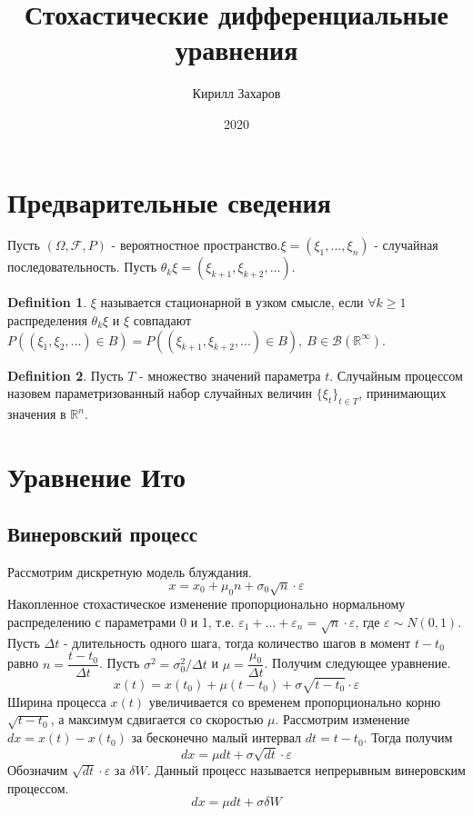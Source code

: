 \documentclass[12pt]{article}
\title{Стохастические дифференциальные уравнения}
\author{Кирилл Захаров}
\date{2020}
\theoremstyle{definition}
\newtheorem{definition}{Definition}[section]
\begin{document}
\maketitle
\tableofcontents
\section{Предварительные сведения}
Пусть $(\Omega,\mathcal{F},P)$ - вероятностное пространство.$\xi=(\xi_1,...,\xi_n)$ - случайная последовательность.
Пусть $\theta_k\xi=(\xi_{k+1},\xi_{k+2},...)$.
\begin{definition}
  $\xi $ называется стационарной в узком смысле, если $\forall k\geq1$ распределения $\theta_k\xi$ и $\xi$ совпадают
  $P((\xi_1,\xi_2,...)\in B)=P((\xi_{k+1},\xi_{k+2},...)\in B), \: B\in\mathcal{B}(\mathbb{R}^{\infty})$.
\end{definition}
\begin{definition}
  Пусть $ T$ - множество значений параметра $t$. Случайным процессом назовем параметризованный набор случайных величин
   $\{ \xi_t\}_{t\in T}$, принимающих значения
  в $\mathbb{R}^n$.
\end{definition}
\section{Уравнение Ито}
\subsection{Винеровский процесс}
Рассмотрим дискретную модель блуждания.
\begin{equation}
  x=x_0+\mu_0 n+\sigma_0\sqrt{n}\cdot\varepsilon
\end{equation}
Накопленное стохастическое изменение пропорционально нормальному распределению с параметрами 0 и 1, т.е.
 $\varepsilon_1+...+\varepsilon_n=\sqrt{n}\cdot\varepsilon$, где $\varepsilon\sim N(0,1)$.
Пусть $\Delta t$ - длительность одного шага, тогда количество шагов в момент $t-t_0$ равно $n=\dfrac{t-t_0}{\Delta t}$.
Пусть $\sigma^2=\sigma_0^2/\Delta t$ и $\mu=\dfrac{\mu_0}{\Delta t}$. Получим следующее уравнение.
\begin{equation}
  x(t)=x(t_0)+\mu(t-t_0)+\sigma\sqrt{t-t_0}\cdot\varepsilon
\end{equation}
Ширина процесса $x(t)$ увеличивается со временем пропорционально корню $\sqrt{t-t_0}$, а максимум сдвигается со скоростью
 $\mu$.
 Рассмотрим изменение $dx=x(t)-x(t_0)$ за бесконечно малый интервал $dt=t-t_0$. Тогда получим
 \begin{equation}
   dx=\mu dt+\sigma \sqrt{dt}\cdot\varepsilon
 \end{equation}
 Обозначим $ \sqrt{dt}\cdot\varepsilon$ за $\delta W$. Данный процесс называется непрерывным винеровским процессом.
\begin{equation}
  dx=\mu dt+\sigma \delta W
\end{equation}
\end{document}
